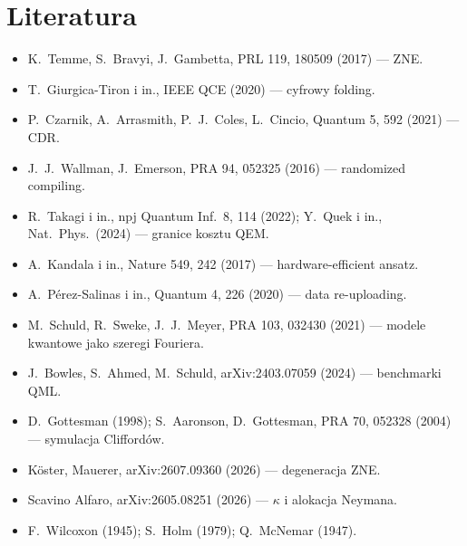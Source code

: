 \documentclass[11pt,a4paper]{article}
\begin{document}
\section*{Literatura}
\small
\begin{itemize}[leftmargin=*]
  \item K.~Temme, S.~Bravyi, J.~Gambetta, PRL 119, 180509 (2017) --- ZNE.
  \item T.~Giurgica-Tiron i in., IEEE QCE (2020) --- cyfrowy folding.
  \item P.~Czarnik, A.~Arrasmith, P.~J.~Coles, L.~Cincio, Quantum 5, 592 (2021) --- CDR.
  \item J.~J.~Wallman, J.~Emerson, PRA 94, 052325 (2016) --- randomized compiling.
  \item R.~Takagi i in., npj Quantum Inf.\ 8, 114 (2022); Y.~Quek i in., Nat.\ Phys.\ (2024) --- granice kosztu QEM.
  \item A.~Kandala i in., Nature 549, 242 (2017) --- hardware-efficient ansatz.
  \item A.~Pérez-Salinas i in., Quantum 4, 226 (2020) --- data re-uploading.
  \item M.~Schuld, R.~Sweke, J.~J.~Meyer, PRA 103, 032430 (2021) --- modele kwantowe jako szeregi Fouriera.
  \item J.~Bowles, S.~Ahmed, M.~Schuld, arXiv:2403.07059 (2024) --- benchmarki QML.
  \item D.~Gottesman (1998); S.~Aaronson, D.~Gottesman, PRA 70, 052328 (2004) --- symulacja Cliffordów.
  \item Köster, Mauerer, arXiv:2607.09360 (2026) --- degeneracja ZNE.
  \item Scavino Alfaro, arXiv:2605.08251 (2026) --- $\kappa$ i alokacja Neymana.
  \item F.~Wilcoxon (1945); S.~Holm (1979); Q.~McNemar (1947).
\end{itemize}
\end{document}
